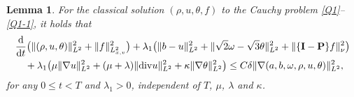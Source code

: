 \documentclass[reqno,11pt]{amsart}
\theoremstyle{plain}
\newtheorem{lem}[thm]{Lemma}
\numberwithin{equation}{section}
\begin{document}
\begin{lem}\label{L3.1}
For the  classical solution $(\rho, u,\theta,f)$ to the Cauchy problem \eqref{Q1}--\eqref{Q1-1}, it holds that 
\begin{align}\label{G3.4}
&\frac{\rm d}{{\rm d}t}\big(\|(\rho,u,\theta)\|_{L^2}^{2} +\|f\|_{L_{x,v}^{2}}^2\big)+\lambda_1\big(\|b-u\|_{L^2}^{2}
+\|\sqrt{2}\omega-\sqrt{3}\theta\|_{L^2}^2+\|\{\mathbf{I}-\mathbf{P}\}f\|_{\nu}^{2}\big)\nonumber\\
&%
\quad+\lambda_1\big(\mu\|\nabla u\|_{L^2}^2+(\mu+\lambda)\| {\rm div}u\|_{L^2}^2+\kappa\|\nabla\theta\|_{L^2}^2\big)
 \leq C\delta\|\nabla(a,b,\omega,\rho,u,\theta)\|_{L^2}^2,
\end{align}
for any $0 \leq t < T$ and $\lambda_1>0$,   independent of  $T$, $\mu$, $\lambda$ and
$\kappa$. 
\end{lem}
\end{document}
